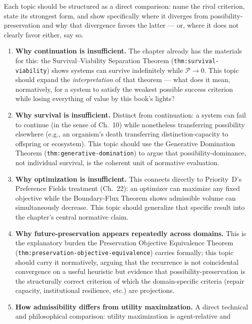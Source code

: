 \documentclass[11pt]{report}
\begin{document}
Each topic should be structured as a direct comparison: name
the rival criterion, state its strongest form, and show
specifically where it diverges from possibility-preservation
and why that divergence favors the latter — or, where it does
not clearly favor either, say so.

\begin{enumerate}
\item \textbf{Why continuation is insufficient.} The chapter
  already has the materials for this: the Survival--Viability
  Separation Theorem (\texttt{thm:survival-viability}) shows
  systems can survive indefinitely while $\mathcal{P}\to0$.
  This topic should expand the \emph{interpretation} of that
  theorem --- what does it mean, normatively, for a system to
  satisfy the weakest possible success criterion while losing
  everything of value by this book's lights?
\item \textbf{Why survival is insufficient.} Distinct from
  continuation: a system can fail to continue (in the sense of
  Ch.~10) while nonetheless transferring possibility elsewhere
  (e.g., an organism's death transferring distinction-capacity
  to offspring or ecosystem). This topic should use the
  Generative Domination Theorem
  (\texttt{thm:generative-domination}) to argue that
  possibility-dominance, not individual survival, is the
  coherent unit of normative evaluation.
\item \textbf{Why optimization is insufficient.} This connects
  directly to Priority~D's Preference Fields treatment
  (Ch.~22): an optimizer can maximize any fixed objective while
  the Boundary-Flux Theorem shows admissible volume can
  simultaneously decrease. This topic should generalize that
  specific result into the chapter's central normative claim.
\item \textbf{Why future-preservation appears repeatedly across
  domains.} This is the explanatory burden the
  Preservation Objective Equivalence Theorem
  (\texttt{thm:preservation-objective-equivalence}) carries
  formally; this topic should carry it normatively, arguing
  that the recurrence is not coincidental convergence on a
  useful heuristic but evidence that possibility-preservation
  is the structurally correct criterion of which the
  domain-specific criteria (repair capacity, institutional
  resilience, etc.) are projections.
\item \textbf{How admissibility differs from utility
  maximization.} A direct technical and philosophical
  comparison: utility maximization is agent-relative and

\end{enumerate}
\end{document}
